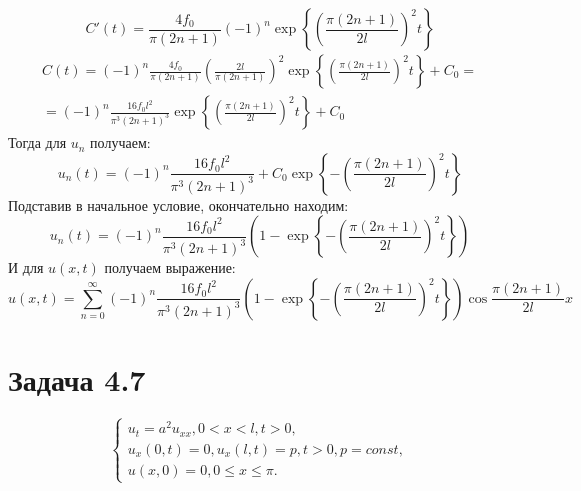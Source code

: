 \documentclass[11pt]{article}
\begin{document}
\begin{equation*}
C'(t) = \frac{4f_0}{\pi(2n + 1)}(-1)^n\exp\left\{\left(\frac{\pi(2n + 1)}{2l}\right)^2t\right\}
\end{equation*}
\begin{multline*}
C(t) = (-1)^n\frac{4f_0}{\pi(2n + 1)}\left(\frac{2l}{\pi(2n + 1)}\right)^2\exp\left\{\left(\frac{\pi(2n + 1)}{2l}\right)^2t\right\} + C_0 = \\
= (-1)^n\frac{16f_0l^2}{\pi^3(2n + 1)^3}\exp\left\{\left(\frac{\pi(2n + 1)}{2l}\right)^2t\right\} + C_0
\end{multline*}
Тогда для $u_n$ получаем:
\begin{equation*}
u_n(t) = (-1)^n\frac{16f_0l^2}{\pi^3(2n + 1)^3} + C_0\exp\left\{-\left(\frac{\pi(2n + 1)}{2l}\right)^2t\right\}
\end{equation*}
Подставив в начальное условие, окончательно находим:
\begin{equation*}
u_n(t) = (-1)^n\frac{16f_0l^2}{\pi^3(2n + 1)^3}\left(1 - \exp\left\{-\left(\frac{\pi(2n + 1)}{2l}\right)^2t\right\}\right)
\end{equation*}
И для $u(x, t)$ получаем выражение:
\begin{equation}
u(x, t) = \sum_{n = 0}^{\infty}(-1)^n\frac{16f_0l^2}{\pi^3(2n + 1)^3}\left(1 - \exp\left\{-\left(\frac{\pi(2n + 1)}{2l}\right)^2t\right\}\right)\cos\frac{\pi(2n + 1)}{2l}x
\end{equation}
\section{Задача 4.7}
\label{sec:org0dff4da}
\begin{equation}
\begin{cases}
u_t = a^2u_{xx}, 0 < x < l, t > 0, \\
u_x(0, t) = 0, u_x(l, t) = p, t > 0, p = const, \\
u(x, 0) = 0, 0 \leq x \leq \pi.
\end{cases}
\end{equation}
\end{document}
